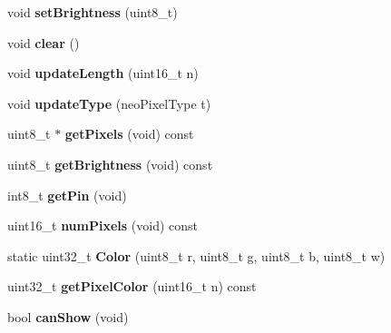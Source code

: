 \begin{DoxyCompactItemize}
void {\bfseries set\+Brightness} (uint8\+\_\+t)
\item 
\mbox{\label{class_adafruit___neo_pixel_ac06a711d7bf63bada61b52a1d528e4b4}} 
void {\bfseries clear} ()
\item 
\mbox{\label{class_adafruit___neo_pixel_a74e917093c2eb16848c4a09427680f79}} 
void {\bfseries update\+Length} (uint16\+\_\+t n)
\item 
\mbox{\label{class_adafruit___neo_pixel_a07b6949674125159484e9e02ef025f7d}} 
void {\bfseries update\+Type} (neo\+Pixel\+Type t)
\item 
\mbox{\label{class_adafruit___neo_pixel_ab484e9a9da6f1089091c2cda1a0841a7}} 
uint8\+\_\+t $\ast$ {\bfseries get\+Pixels} (void) const
\item 
\mbox{\label{class_adafruit___neo_pixel_ab1b7af02712d6a1e228783a89ec12832}} 
uint8\+\_\+t {\bfseries get\+Brightness} (void) const
\item 
\mbox{\label{class_adafruit___neo_pixel_a998ce8e3289315d25dd1332e28a8a7f3}} 
int8\+\_\+t {\bfseries get\+Pin} (void)
\item 
\mbox{\label{class_adafruit___neo_pixel_a515921e2c768750698f199c27613a143}} 
uint16\+\_\+t {\bfseries num\+Pixels} (void) const
\item 
\mbox{\label{class_adafruit___neo_pixel_a5d8696db629461046c05aaaff6c576b0}} 
static uint32\+\_\+t {\bfseries Color} (uint8\+\_\+t r, uint8\+\_\+t g, uint8\+\_\+t b, uint8\+\_\+t w)
\item 
\mbox{\label{class_adafruit___neo_pixel_abccaba27e35bfae27c856e76b46c7924}} 
uint32\+\_\+t {\bfseries get\+Pixel\+Color} (uint16\+\_\+t n) const
\item 
\mbox{\label{class_adafruit___neo_pixel_a9e900a60b0ac2b43b99309bb118b929e}} 
bool {\bfseries can\+Show} (void)
\end{DoxyCompactItemize}
